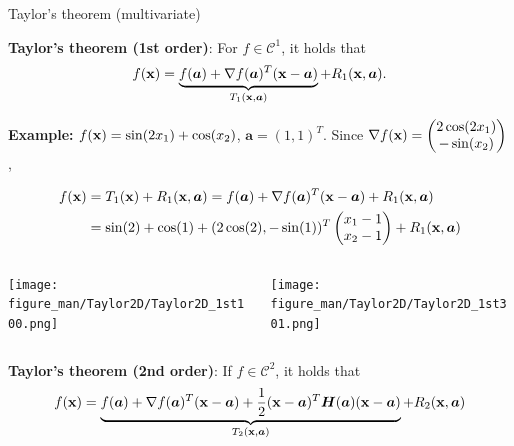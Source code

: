 \documentclass[11pt,compress,t,notes=noshow, xcolor=table]{beamer}
\begin{document}
\begin{vbframe}{Taylor's theorem (multivariate)}

\vspace{-\baselineskip}


\textbf{Taylor's theorem (1st order)}: For $f\in\mathcal{C}^1$, it holds that
\begin{equation*}
    f(\mathbf{x}) = \underbrace{f(\bm{a}) + \nabla f(\bm{a})^T (\mathbf{x} - \bm{a})}_{T_1(\mathbf{x}, \bm{a})} + R_1(\mathbf{x},\bm{a}).
\end{equation*}


\begin{footnotesize}
    \textbf{Example: } $f(\mathbf{x}) = \sin(2x_1) + \cos(x_2)$, $\bm{a} = (1, 1)^T$.
    Since $\nabla f(\mathbf{x}) = \begin{pmatrix}2\cos(2x_1) \\ -\sin(x_2)\end{pmatrix}$,

    \vspace{-0.7\baselineskip}

    \begin{align*}
        f(\mathbf{x}) &= T_1(\mathbf{x}) + R_1(\mathbf{x}, \bm{a}) = f(\bm{a}) + \nabla f(\bm{a})^T (\mathbf{x} - \bm{a}) + R_1(\mathbf{x}, \bm{a})\\
        &= \sin(2) + \cos(1) + (2 \cos(2), - \sin(1))^T\begin{pmatrix} x_1 - 1 \\ x_2 - 1\end{pmatrix} + R_1(\mathbf{x}, \bm{a})
    \end{align*}
\end{footnotesize}

\vspace*{-0.5\baselineskip}

\begin{columns}
    \begin{column}{0.4\textwidth}
        \texttt{[image: figure\_man/Taylor2D/Taylor2D\_1st100.png]}
    \end{column}
    \begin{column}{0.4\textwidth}
        \texttt{[image: figure\_man/Taylor2D/Taylor2D\_1st301.png]}
    \end{column}
\end{columns}

\framebreak

\vspace*{-1cm}


\textbf{Taylor's theorem (2nd order)}: If $f \in \mathcal{C}^2$, it holds that
\begin{equation*}
    f(\mathbf{x}) = \underbrace{f(\bm{a}) + \nabla f(\bm{a})^T (\mathbf{x} - \bm{a}) + \frac{1}{2}(\mathbf{x} - \bm{a})^T\bm{H}(\bm{a})(\mathbf{x} - \bm{a})}_{T_2(\mathbf{x}, \bm{a})} + R_2(\mathbf{x},\bm{a})
\end{equation*}



\end{vbframe}
\end{document}
